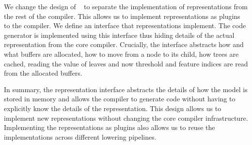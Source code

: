 We change the design of \TreebeardOLD{}~\cite{Treebeard} to
separate the implementation of representations from the rest of the compiler. This allows
us to implement representations as plugins to the compiler. We define an interface 
that representations implement. The code generator is implemented using
this interface thus hiding details of the actual representation from the core 
compiler. Crucially, the interface abstracts how and what buffers 
are allocated, how to move from a node to its child, how trees 
are cached, reading the value of leaves and now threshold and 
feature indices are read from the allocated buffers.

In summary, the representation interface abstracts the details of how the model is stored in memory
and allows the compiler to generate code without having to explicitly know the details of the
representation. This design allows us to implement new representations without changing the core
compiler infrastructure. Implementing the representations as plugins also allows us to reuse
the implementations across different lowering pipelines. 

